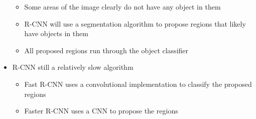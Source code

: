 \documentclass[12pt, letterpaper]{article}
\begin{document}
\begin{itemize}
\begin{itemize}
            \item Some areas of the image clearly do not have any object in them
            \item R-CNN will use a segmentation algorithm to propose regions that likely have objects in them
            \item All proposed regions run through the object classifier
        \end{itemize}
        \item R-CNN still a relatively slow algorithm
        \begin{itemize}
            \item Fast R-CNN uses a convolutional implementation to classify the proposed regions 
            \item Faster R-CNN uses a CNN to propose the regions 
        \end{itemize}

\end{itemize}
\end{document}
